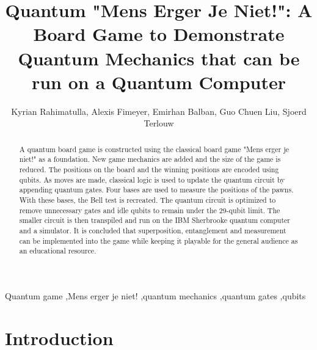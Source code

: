 \documentclass[final,5p,times,twocolumn,authoryear]{elsarticle}
\begin{document}
\begin{frontmatter}

\title{Quantum "Mens Erger Je Niet!": A Board Game to Demonstrate Quantum Mechanics that can be run on a Quantum Computer}

\author[first]{Kyrian Rahimatulla, Alexis Fimeyer, Emirhan Balban, Guo Chuen Liu, Sjoerd Terlouw}

\begin{abstract}
A quantum board game is constructed using the classical board game "Mens erger je niet!" as a foundation. New game mechanics are added and the size of the game is reduced. The positions on the board and the winning positions are encoded using qubits. As moves are made, classical logic is used to update the quantum circuit by appending quantum gates. Four bases are used to measure the positions of the pawns. With these bases, the Bell test is recreated. The quantum circuit is optimized to remove unnecessary gates and idle qubits to remain under the 29-qubit limit. The smaller circuit is then transpiled and run on the IBM Sherbrooke quantum computer and a simulator. It is concluded that superposition, entanglement and measurement can be implemented into the game while keeping it playable for the general audience as an educational resource.
\end{abstract}

\begin{keyword}
Quantum game \sep Mens erger je niet! \sep quantum mechanics \sep quantum gates \sep qubits


\end{keyword}


\end{frontmatter}




\section{Introduction}
\label{introduction}
\end{document}
